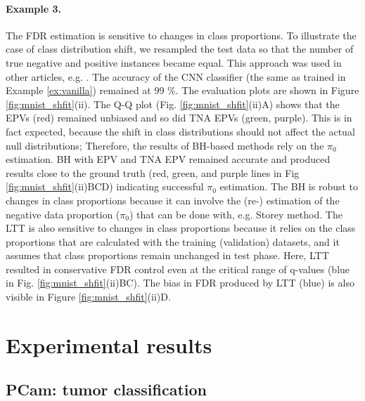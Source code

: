 \documentclass{article}
\begin{document}
\paragraph{Example 3.} The FDR estimation is sensitive to changes in class proportions. To illustrate the case of class distribution shift, we resampled the test data so that the number of true negative and positive instances became equal. This approach was used in other articles, e.g.  \cite{joseph_d__viviano__2019}. The accuracy of the CNN classifier (the same as trained in Example \ref{ex:vanilla}) remained at 99 \%. The evaluation plots are shown in Figure \ref{fig:mnist_shfit}(ii). The Q-Q plot (Fig. \ref{fig:mnist_shfit}(ii)A) shows that the EPVs (red) remained unbiased and so did TNA EPVs (green, purple). This is in  fact expected, because the shift in class distributions should not affect the actual null distributions; Therefore, the results of BH-based methods rely on the $\pi_0$ estimation. BH with EPV and TNA EPV remained accurate and produced results close to the ground truth (red, green, and purple lines in Fig \ref{fig:mnist_shfit}(ii)BCD) indicating successful $\pi_0$ estimation. The BH is robust to changes in class proportions because it can involve the (re-) estimation of the negative data proportion ($\pi_0$) that can be done with, e.g. Storey method. The LTT is also sensitive to changes in class proportions because it relies on the class proportions that are calculated with the training (validation) datasets, and it assumes that class proportions remain unchanged in test phase. Here, LTT resulted in conservative FDR control even at the critical range of q-values (blue in Fig. \ref{fig:mnist_shfit}(ii)BC). The bias in FDR produced by LTT (blue) is also visible in Figure \ref{fig:mnist_shfit}(ii)D. 



\section{Experimental results}

\subsection{PCam: tumor classification}
\end{document}
